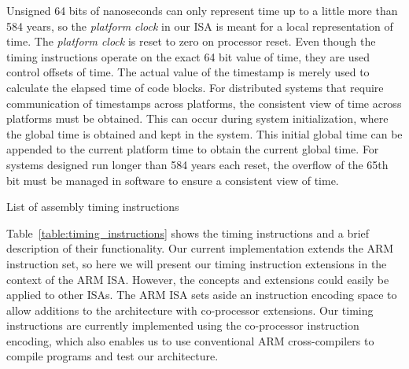 Unsigned 64 bits of nanoseconds can only represent time up to a little more than 584 years, so the \emph{platform clock} in our ISA is meant for a local representation of time. 
The \emph{platform clock} is reset to zero on processor reset. 
Even though the timing instructions operate on the exact 64 bit value of time, they are used control offsets of time. 
The actual value of the timestamp is merely used to calculate the elapsed time of code blocks.
For distributed systems that require communication of timestamps across platforms, the consistent view of time across platforms must be obtained. 
This can occur during system initialization, where the global time is obtained and kept in the system.  
This initial global time can be appended to the current platform time to obtain the current global time. 
For systems designed run longer than 584 years each reset, the overflow of the 65th bit must be managed in software to ensure a consistent view of time.


\begin{table}[h]
\noindent{}
\caption{List of assembly timing instructions}
\label{table:timing_instructions}
\end{table}

Table~\ref{table:timing_instructions} shows the timing instructions and a brief description of their functionality.   
Our current implementation extends the ARM~\cite{armrefman} instruction set, so here we will present our timing instruction extensions in the context of the ARM ISA.
However, the concepts and extensions could easily be applied to other ISAs. 
The ARM ISA sets aside an instruction encoding space to allow additions to the architecture with co-processor extensions. 
Our timing instructions are currently implemented using the co-processor instruction encoding, which also enables us to use conventional ARM cross-compilers to compile programs and test our architecture.     

